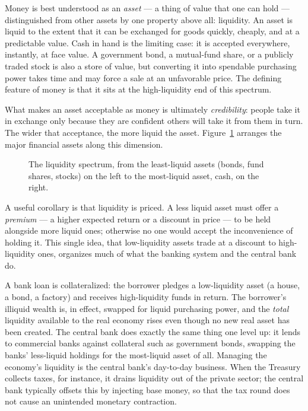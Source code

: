 Money is best understood as an \emph{asset} --- a thing of value that one can hold --- distinguished from other assets by one property above all: liquidity. An asset is liquid to the extent that it can be exchanged for goods quickly, cheaply, and at a predictable value. Cash in hand is the limiting case: it is accepted everywhere, instantly, at face value. A government bond, a mutual-fund share, or a publicly traded stock is also a store of value, but converting it into spendable purchasing power takes time and may force a sale at an unfavorable price. The defining feature of money is that it sits at the high-liquidity end of this spectrum.

What makes an asset acceptable as money is ultimately \emph{credibility}: people take it in exchange only because they are confident others will take it from them in turn. The wider that acceptance, the more liquid the asset. Figure~\ref{fig:macro-10} arranges the major financial assets along this dimension.

\begin{figure}[h]
\centering

\caption{The liquidity spectrum, from the least-liquid assets (bonds, fund shares, stocks) on the left to the most-liquid asset, cash, on the right.}
\label{fig:macro-10}
\end{figure}


A useful corollary is that liquidity is priced. A less liquid asset must offer a \emph{premium} --- a higher expected return or a discount in price --- to be held alongside more liquid ones; otherwise no one would accept the inconvenience of holding it. This single idea, that low-liquidity assets trade at a discount to high-liquidity ones, organizes much of what the banking system and the central bank do.

\begin{remark}
A bank loan is collateralized: the borrower pledges a low-liquidity asset (a house, a bond, a factory) and receives high-liquidity funds in return. The borrower's illiquid wealth is, in effect, swapped for liquid purchasing power, and the \emph{total} liquidity available to the real economy rises even though no new real asset has been created. The central bank does exactly the same thing one level up: it lends to commercial banks against collateral such as government bonds, swapping the banks' less-liquid holdings for the most-liquid asset of all. Managing the economy's liquidity is the central bank's day-to-day business. When the Treasury collects taxes, for instance, it drains liquidity out of the private sector; the central bank typically offsets this by injecting base money, so that the tax round does not cause an unintended monetary contraction.
\end{remark}

